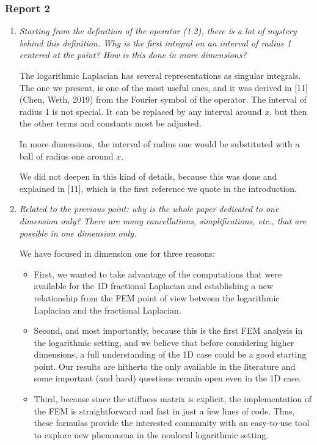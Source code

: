 \documentclass[11 pt]{article}
\numberwithin{equation}{section}
\begin{document}
\subsubsection*{Report 2}


\begin{enumerate}
    \item \emph{ Starting from the definition of the operator (1.2), there is a lot of mystery behind this definition. Why is the first integral on an interval of radius 1 centered at the point? How is this done in more dimensions?}

    The logarithmic Laplacian has several representations as singular integrals. The one we present, is one of the most useful ones, and it was derived in [11] (Chen, Weth, 2019) from the Fourier symbol of the operator. The interval of radius 1 is not special. It can be replaced by any interval around $x$, but then the other terms and constants most be adjusted.

    In more dimensions, the interval of radius one would be substituted with a ball of radius one around $x$.

    We did not deepen in this kind of details, because this was done and explained in [11], which is the first reference we quote in the introduction.

    \item \emph{Related to the previous point: why is the whole paper dedicated to one dimension only? There are many cancellations, simplifications, etc., that are possible in one dimension only.}

    We have focused in dimension one for three reasons:
\begin{itemize}
 \item First, we wanted to take advantage of the computations that were available for the 1D fractional Laplacian and establishing a new relationship from the FEM point of view between the logarithmic Laplacian and the fractional Laplacian.
 \item  Second, and most importantly, because this is the first FEM analysis in the logarithmic setting, and we believe that before considering higher dimensions, a full understanding of the 1D case could be a good starting point.  Our results are hitherto the only available in the literature and some important (and hard) questions remain open even in the 1D case.
 \item Third, because since the stiffness matrix is explicit, the implementation of the FEM is straightforward and fast in just a few lines of code. Thus, these formulas provide the interested community with an easy-to-use tool to explore new phenomena in the nonlocal logarithmic setting.
\end{itemize}


\end{enumerate}
\end{document}
